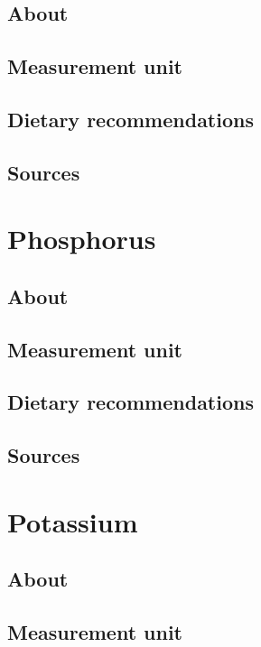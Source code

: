 \documentclass{book}
\begin{document}
\section{About}


\section{Measurement unit}


\section{Dietary recommendations}


\section{Sources}


\chapter{Phosphorus}
\section{About}


\section{Measurement unit}


\section{Dietary recommendations}


\section{Sources}


\chapter{Potassium}
\section{About}


\section{Measurement unit}
\end{document}

